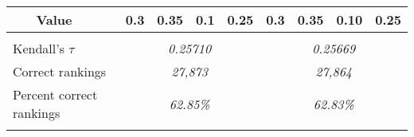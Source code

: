 \documentclass[paper=a4, fontsize=11pt]{scrartcl}
\numberwithin{equation}{section}		%
\numberwithin{figure}{section}			%
\numberwithin{table}{section}				%
\begin{document}
\begin{table}[]
{\begin{tabular}{llclllclll}
\multicolumn{1}{|l|}{}                                                                                                                  & \multicolumn{1}{l|}{Value}         & \multicolumn{1}{l|}{0.3}     & \multicolumn{1}{l|}{0.35} & \multicolumn{1}{l|}{0.1}   & \multicolumn{1}{l|}{0.25} & \multicolumn{1}{l|}{0.3}     & \multicolumn{1}{l|}{0.35} & \multicolumn{1}{l|}{0.10}  & \multicolumn{1}{l|}{0.25} \\ \hline
\multicolumn{2}{|l|}{}                                                                                                                                                       & \multicolumn{1}{l}{}         &                           &                            &                           & \multicolumn{1}{l}{}         &                           &                            & \multicolumn{1}{l|}{}     \\ \hline
\multicolumn{2}{|l|}{Kendall's $\tau$}                                                                                                                                       & \multicolumn{4}{c|}{{\it 0.25710}}                                                                                & \multicolumn{4}{c|}{{\it 0.25669}}                                                                                \\ \hline
\multicolumn{2}{|l|}{Correct rankings}                                                                                                                                       & \multicolumn{4}{c|}{{\it 27,873}}                                                                                 & \multicolumn{4}{c|}{{\it 27,864}}                                                                                 \\ \hline
\multicolumn{2}{|l|}{Percent correct rankings}                                                                                                                               & \multicolumn{4}{c|}{{\it 62.85\%}}                                                                                & \multicolumn{4}{c|}{{\it 62.83\%}}                                                                                \\ \hline
                                                                                                                                        &                                    & \multicolumn{1}{l}{}         &                           &                            &                           & \multicolumn{1}{l}{}         &                           &                            &                           \\ \cline{3-10} 

\end{tabular}}
\end{table}
\end{document}
